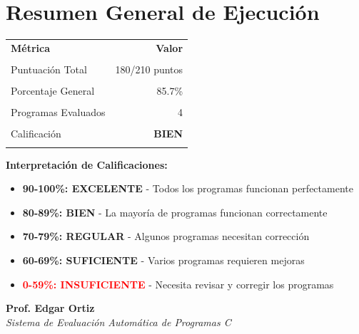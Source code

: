 \documentclass[11pt]{article}
\begin{document}
\clearpage
\vspace{1cm}
\section*{\textbf{Resumen General de Ejecución}}

\begin{center}
\begin{tabular}{l r}
\toprule
\textbf{Métrica} & \textbf{Valor} \\\\
\midrule
Puntuación Total & 180/210 puntos \\\\
Porcentaje General & 85.7\% \\\\
Programas Evaluados & 4 \\\\
Calificación & \textcolor{commentgreen}{\textbf{BIEN}} \\\\
\bottomrule
\end{tabular}
\end{center}

\vspace{0.5cm}
\begin{center}
\textbf{Interpretación de Calificaciones:}\\[0.3cm]
\begin{itemize}
\item \textcolor{commentgreen}{\textbf{90-100\%: EXCELENTE}} - Todos los programas funcionan perfectamente
\item \textcolor{commentgreen}{\textbf{80-89\%: BIEN}} - La mayoría de programas funcionan correctamente
\item \textcolor{scoreorange}{\textbf{70-79\%: REGULAR}} - Algunos programas necesitan corrección
\item \textcolor{scoreorange}{\textbf{60-69\%: SUFICIENTE}} - Varios programas requieren mejoras
\item \textcolor{red}{\textbf{0-59\%: INSUFICIENTE}} - Necesita revisar y corregir los programas
\end{itemize}
\end{center}

\vspace{1cm}
\begin{center}
\textbf{Prof. Edgar Ortiz}\\[0.2cm]
\small\textit{Sistema de Evaluación Automática de Programas C}
\end{center}
\end{document}
